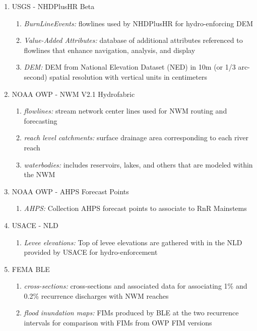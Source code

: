 \begin{enumerate}
\item{USGS - NHDPlusHR Beta}
    \begin{enumerate}
    \item{\textit{BurnLineEvents:} flowlines used by NHDPlusHR for hydro-enforcing DEM}
    \item{\textit{Value-Added Attributes:} database of additional attributes referenced to flowlines that enhance navigation, analysis, and display}
    \item{\textit{DEM:} DEM from National Elevation Dataset (NED) in 10m (or 1/3 arc-second) spatial resolution with vertical units in centimeters \cite{gesch2002national}}
    \end{enumerate}
\item{NOAA OWP - NWM V2.1 Hydrofabric}
    \begin{enumerate}
    \item{\textit{flowlines:} stream network center lines used for NWM routing and forecasting}
    \item{\textit{reach level catchments:} surface drainage area corresponding to each river reach}
    \item{\textit{waterbodies:} includes reservoirs, lakes, and others that are modeled within the NWM}
    \end{enumerate}
\item{NOAA OWP - AHPS Forecast Points}
    \begin{enumerate}
    \item{\textit{AHPS:} Collection AHPS forecast points to associate to RnR Mainstems}
    \end{enumerate}
\item{USACE - NLD}
    \begin{enumerate}
    \item{\textit{Levee elevations:} Top of levee elevations are gathered with in the NLD provided by USACE for hydro-enforcement}
    \end{enumerate}
\item{FEMA BLE}
    \begin{enumerate}
    \item{\textit{cross-sections:} cross-sections and associated data for associating 1\% and 0.2\% recurrence discharges with NWM reaches}
    \item{\textit{flood inundation maps:} FIMs produced by BLE at the two recurrence intervals for comparison with FIMs from OWP FIM versions}
    \end{enumerate}
\end{enumerate}

